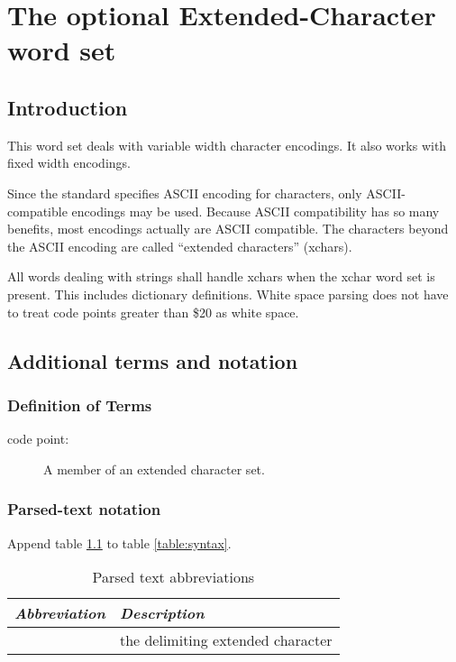 \chapter{The optional Extended-Character word set} %

\section{Introduction} %
\label{xchar:intro}

This word set deals with variable width character encodings.  It also
works with fixed width encodings.

Since the standard specifies ASCII encoding for characters, only
ASCII-compatible encodings may be used.  Because ASCII compatibility
has so many benefits, most encodings actually are ASCII compatible.
The characters beyond the ASCII encoding are called ``extended
characters'' (xchars).

All words dealing with strings shall handle xchars when the xchar word
set is present.  This includes dictionary definitions.  White space
parsing does not have to treat code points greater than \$20 as white
space.

\section{Additional terms and notation} %

\subsection{Definition of Terms} %

\begin{description}
\item[code point:] A member of an extended character set.
\end{description}

\subsection{Parsed-text notation}

Append table \ref{xchar:syntax} to table \ref{table:syntax}.

\begin{table}[ht]
	\begin{center}
		\caption{Parsed text abbreviations}
		\label{xchar:syntax}
		\begin{tabular}{ll}
		\hline\hline
			\emph{Abbreviation} & \emph{Description} \\ \hline
			\param{<xchar>} & the delimiting extended character \\
		\hline\hline
		\end{tabular}
	\end{center}
\end{table}

